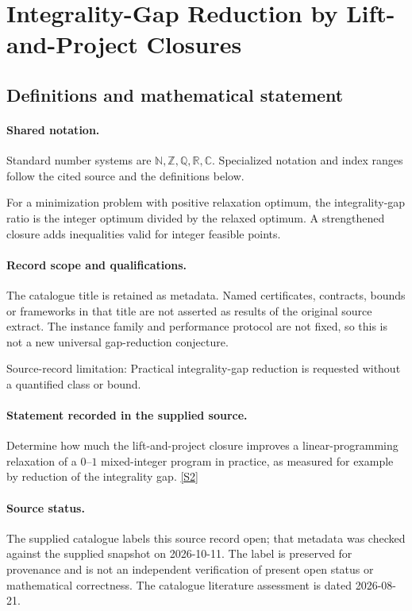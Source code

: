 \documentclass[11pt]{article}
\newcommand{\sref}[2]{\hyperlink{source:#1:#2}{[S#2]}}
\begin{document}
\section{Integrality-Gap Reduction by Lift-and-Project Closures}\label{statement}

\subsection{Definitions and mathematical statement}

\paragraph{Shared notation.}Standard number systems are $\mathbb N,\mathbb Z,\mathbb Q,\mathbb R,\mathbb C$. Specialized notation and index ranges follow the cited source and the definitions below.


For a minimization problem with positive relaxation optimum, the integrality-gap ratio is the integer optimum divided by the relaxed optimum. A strengthened closure adds inequalities valid for integer feasible points.
\paragraph{Record scope and qualifications.}
The catalogue title is retained as metadata. Named certificates, contracts, bounds or frameworks in that title are not asserted as results of the original source extract.
The instance family and performance protocol are not fixed, so this is not a new universal gap-reduction conjecture.

Source-record limitation: Practical integrality-gap reduction is requested without a quantified class or bound.
\paragraph{Statement recorded in the supplied source.}
Determine how much the lift-and-project closure improves a linear-programming relaxation of a $0$–$1$ mixed-integer program in practice, as measured for example by reduction of the integrality gap. \sref{statement}{2}
\paragraph{Source status.}
The supplied catalogue labels this source record open; that metadata was checked against the supplied snapshot on 2026-10-11. The label is preserved for provenance and is not an independent verification of present open status or mathematical correctness. The catalogue literature assessment is dated 2026-08-21.
\end{document}
